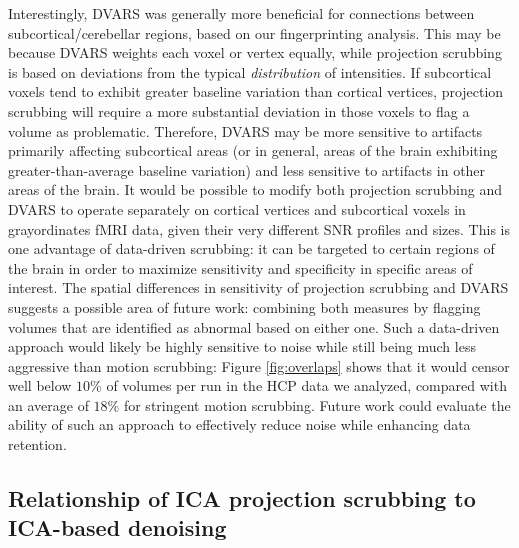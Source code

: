 \documentclass{article}
\begin{document}
Interestingly, DVARS was generally more beneficial for connections between subcortical/cerebellar regions, based on our fingerprinting analysis. This may be because DVARS weights each  voxel or vertex equally, while projection scrubbing is based on deviations from the typical \textit{distribution} of intensities. If subcortical voxels tend to exhibit greater baseline variation than cortical vertices, projection scrubbing will require a more substantial deviation in those voxels to flag a volume as problematic. Therefore, DVARS may be more sensitive to artifacts primarily affecting subcortical areas (or in general, areas of the brain exhibiting greater-than-average baseline variation) and less sensitive to artifacts in other areas of the brain. It would be possible to modify both projection scrubbing and DVARS to operate separately on cortical vertices and subcortical voxels in grayordinates fMRI data, given their very different SNR profiles and sizes.  This is one advantage of data-driven scrubbing: it can be targeted to certain regions of the brain in order to maximize sensitivity and specificity in specific areas of interest. The spatial differences in sensitivity of projection scrubbing and DVARS suggests a possible area of future work: combining both measures by flagging volumes that are identified as abnormal based on either one. Such a data-driven approach would likely be highly sensitive to noise while still being much less aggressive than motion scrubbing: Figure \ref{fig:overlaps} shows that it would censor well below $10\%$ of volumes per run in the HCP data we analyzed, compared with an average of $18\%$ for stringent motion scrubbing. Future work could evaluate the ability of such an approach to effectively reduce noise while enhancing data retention.



\subsection{Relationship of ICA projection scrubbing to ICA-based denoising}
\end{document}

